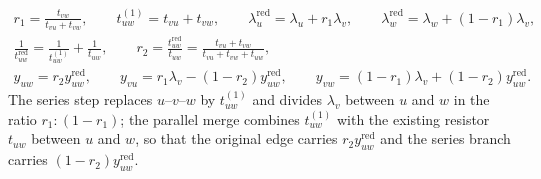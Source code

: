 \documentclass[11pt]{article}
\numberwithin{equation}{section}
\numberwithin{figure}{section}
\numberwithin{table}{section}
\begin{document}
\begin{tcolorbox}[enhanced,colback=white,colframe=black!45,boxrule=0.5pt,arc=1pt,left=4pt,right=4pt,top=2pt,bottom=2pt,fonttitle=\small\bfseries,title={(a) Series--parallel move (Figure \ref{fig-sum-moves}(a)): a degree-two vertex $v$ between $u$ and $w$}]
\begin{equation}\label{eq-sum-moves}
\begin{gathered}
r_1=\frac{t_{vw}}{t_{vu}+t_{vw}},\qquad t^{(1)}_{uw}=t_{vu}+t_{vw},\qquad
\lambda^{\mathrm{red}}_u=\lambda_u+r_1\lambda_v,\qquad
\lambda^{\mathrm{red}}_w=\lambda_w+(1-r_1)\lambda_v,\\
\frac1{t^{\mathrm{red}}_{uw}}=\frac1{t^{(1)}_{uw}}+\frac1{t_{uw}},\qquad
r_2=\frac{t^{\mathrm{red}}_{uw}}{t_{uw}}=\frac{t_{vu}+t_{vw}}{t_{vu}+t_{vw}+t_{uw}},\\
y_{uw}=r_2y^{\mathrm{red}}_{uw},\qquad
y_{vu}=r_1\lambda_v-(1-r_2)y^{\mathrm{red}}_{uw},\qquad
y_{vw}=(1-r_1)\lambda_v+(1-r_2)y^{\mathrm{red}}_{uw}.
\end{gathered}
\end{equation}
The series step replaces $u$--$v$--$w$ by $t^{(1)}_{uw}$ and divides $\lambda_v$ between $u$ and $w$ in the ratio $r_1:(1-r_1)$; the parallel merge combines $t^{(1)}_{uw}$ with the existing resistor $t_{uw}$ between $u$ and $w$, so that the original edge carries $r_2y^{\mathrm{red}}_{uw}$ and the series branch carries $(1-r_2)y^{\mathrm{red}}_{uw}$.
\end{tcolorbox}
\end{document}

